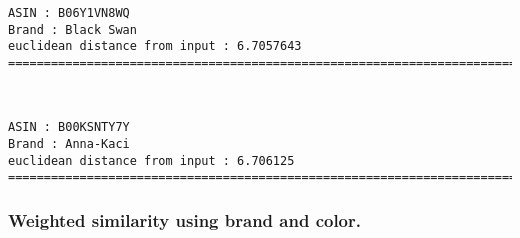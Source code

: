 \documentclass[11pt]{article}
\begin{document}
    \begin{Verbatim}[commandchars=\\\{\}]
ASIN : B06Y1VN8WQ
Brand : Black Swan
euclidean distance from input : 6.7057643
=============================================================================================================================

    \end{Verbatim}

    \begin{center}
    \end{center}
    { \hspace*{\fill} \\}
    
    \begin{Verbatim}[commandchars=\\\{\}]
ASIN : B00KSNTY7Y
Brand : Anna-Kaci
euclidean distance from input : 6.706125
=============================================================================================================================

    \end{Verbatim}

    \subsubsection{Weighted similarity using brand and
color.}\label{weighted-similarity-using-brand-and-color.}
\end{document}
